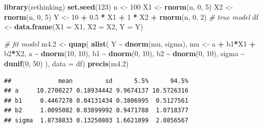 \documentclass[
]{book}
\newenvironment{Shaded}{\begin{snugshade}}{\end{snugshade}}
\newcommand{\AttributeTok}[1]{\textcolor[rgb]{0.13,0.29,0.53}{#1}}
\newcommand{\CommentTok}[1]{\textcolor[rgb]{0.56,0.35,0.01}{\textit{#1}}}
\newcommand{\DecValTok}[1]{\textcolor[rgb]{0.00,0.00,0.81}{#1}}
\newcommand{\FloatTok}[1]{\textcolor[rgb]{0.00,0.00,0.81}{#1}}
\newcommand{\FunctionTok}[1]{\textcolor[rgb]{0.13,0.29,0.53}{\textbf{#1}}}
\newcommand{\NormalTok}[1]{#1}
\newcommand{\OtherTok}[1]{\textcolor[rgb]{0.56,0.35,0.01}{#1}}
\newcommand{\SpecialCharTok}[1]{\textcolor[rgb]{0.81,0.36,0.00}{\textbf{#1}}}
\begin{document}
\begin{Shaded}
\begin{Highlighting}[]
\FunctionTok{library}\NormalTok{(rethinking)}
\FunctionTok{set.seed}\NormalTok{(}\DecValTok{123}\NormalTok{)}
\NormalTok{n }\OtherTok{\textless{}{-}} \DecValTok{100}
\NormalTok{X1 }\OtherTok{\textless{}{-}} \FunctionTok{rnorm}\NormalTok{(n, }\DecValTok{0}\NormalTok{, }\DecValTok{5}\NormalTok{)}
\NormalTok{X2 }\OtherTok{\textless{}{-}} \FunctionTok{rnorm}\NormalTok{(n, }\DecValTok{0}\NormalTok{, }\DecValTok{5}\NormalTok{)}
\NormalTok{Y }\OtherTok{\textless{}{-}} \DecValTok{10} \SpecialCharTok{+} \FloatTok{0.5} \SpecialCharTok{*}\NormalTok{ X1 }\SpecialCharTok{+} \DecValTok{1} \SpecialCharTok{*}\NormalTok{ X2 }\SpecialCharTok{+} \FunctionTok{rnorm}\NormalTok{(n, }\DecValTok{0}\NormalTok{, }\DecValTok{2}\NormalTok{) }\CommentTok{\# true model}
\NormalTok{df }\OtherTok{\textless{}{-}} \FunctionTok{data.frame}\NormalTok{(}\AttributeTok{X1 =}\NormalTok{ X1, }\AttributeTok{X2 =}\NormalTok{ X2, }\AttributeTok{Y =}\NormalTok{ Y)}

\CommentTok{\# fit model}
\NormalTok{m4}\FloatTok{.2} \OtherTok{\textless{}{-}} \FunctionTok{quap}\NormalTok{(}
  \FunctionTok{alist}\NormalTok{(}
\NormalTok{    Y }\SpecialCharTok{\textasciitilde{}} \FunctionTok{dnorm}\NormalTok{(mu, sigma),}
\NormalTok{    mu }\OtherTok{\textless{}{-}}\NormalTok{ a }\SpecialCharTok{+}\NormalTok{ b1}\SpecialCharTok{*}\NormalTok{X1 }\SpecialCharTok{+}\NormalTok{ b2}\SpecialCharTok{*}\NormalTok{X2,}
\NormalTok{    a }\SpecialCharTok{\textasciitilde{}} \FunctionTok{dnorm}\NormalTok{(}\DecValTok{10}\NormalTok{, }\DecValTok{10}\NormalTok{),}
\NormalTok{    b1 }\SpecialCharTok{\textasciitilde{}} \FunctionTok{dnorm}\NormalTok{(}\DecValTok{0}\NormalTok{, }\DecValTok{10}\NormalTok{),}
\NormalTok{    b2 }\SpecialCharTok{\textasciitilde{}} \FunctionTok{dnorm}\NormalTok{(}\DecValTok{0}\NormalTok{, }\DecValTok{10}\NormalTok{),}
\NormalTok{    sigma }\SpecialCharTok{\textasciitilde{}} \FunctionTok{dunif}\NormalTok{(}\DecValTok{0}\NormalTok{, }\DecValTok{50}\NormalTok{)}
\NormalTok{  ), }\AttributeTok{data =}\NormalTok{ df)}
\FunctionTok{precis}\NormalTok{(m4}\FloatTok{.2}\NormalTok{)}
\end{Highlighting}
\end{Shaded}

\begin{verbatim}
##             mean         sd      5.5%      94.5%
## a     10.2700227 0.18934442 9.9674137 10.5726316
## b1     0.4467278 0.04131434 0.3806995  0.5127561
## b2     1.0095082 0.03899992 0.9471788  1.0718377
## sigma  1.8738833 0.13250803 1.6621099  2.0856567
\end{verbatim}
\end{document}
